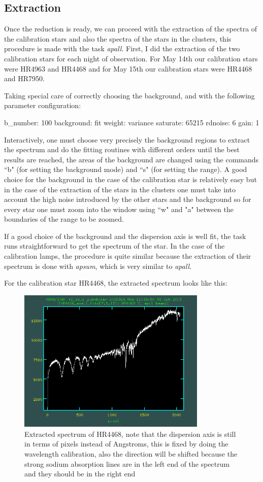\subsection{Extraction}

Once the reduction is ready, we can proceed with the extraction of the spectra of the calibration stars and also the spectra of the stars in the clusters, this procedure is made with the task \textit{apall}. First, I did the extraction of the two calibration stars for each night of observation. For May 14th our calibration stars were HR4963 and HR4468 and for May 15th our calibration stars were HR4468 and HR7950.

Taking special care of correctly choosing the background, and with the following parameter configuration:

b\_number: 100
background: fit
weight: variance
saturate: 65215
rdnoise: 6
gain: 1

Interactively, one must choose very precisely the background regions to extract the spectrum and do the fitting routines with different orders until the best results are reached, the areas of the background are changed using the commands ``b" (for setting the background mode) and ``s" (for setting the range). A good choice for the background in the case of the calibration star is relatively easy but in the case of the extraction of the stars in the clusters one must take into account the high noise introduced by the other stars and the background so for every star one must zoom into the window using ``w" and "a" between the boundaries of the range to be zoomed.

If a good choice of the background and the dispersion axis is well fit, the task runs straightforward to get the spectrum of the star. In the case of the calibration lamps, the procedure is quite similar because the extraction of their spectrum is done with \textit{apsum}, which is very similar to \textit{apall}. 

For the calibration star HR4468, the extracted spectrum looks like this:

\begin{figure}[H]
\centering
\includegraphics[width=9cm]{images/calib_star_apall.png}
\caption[Spectrum of calibration star HR4468]{Extracted spectrum of HR4468, note that the dispersion axis is still in terms of pixels instead of Angstroms, this is fixed by doing the wavelength calibration, also the direction will be shifted because the strong sodium absorption lines are in the left end of the spectrum and they should be in the right end}
\end{figure}


